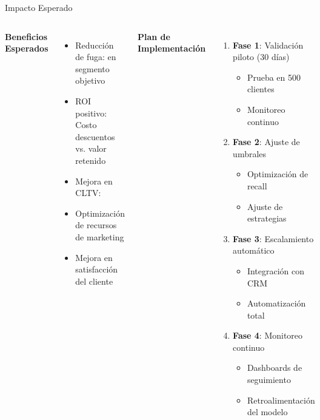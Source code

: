 
\begin{frame}{Impacto Esperado}
    \begin{columns}[t]
        \textbf{Beneficios Esperados}
        \begin{itemize}
            \item Reducción de fuga:  en segmento objetivo
            \item ROI positivo: Costo descuentos vs. valor retenido
            \item Mejora en CLTV: 
            \item Optimización de recursos de marketing
            \item Mejora en satisfacción del cliente
        \end{itemize}
        
        \textbf{Plan de Implementación}
        \begin{enumerate}
            \item \textbf{Fase 1}: Validación piloto (30 días)
            \begin{itemize}
                \item Prueba en 500 clientes
                \item Monitoreo continuo
            \end{itemize}
            \item \textbf{Fase 2}: Ajuste de umbrales
            \begin{itemize}
                \item Optimización de recall
                \item Ajuste de estrategias
            \end{itemize}
            \item \textbf{Fase 3}: Escalamiento automático
            \begin{itemize}
                \item Integración con CRM
                \item Automatización total
            \end{itemize}
            \item \textbf{Fase 4}: Monitoreo continuo
            \begin{itemize}
                \item Dashboards de seguimiento
                \item Retroalimentación del modelo
            \end{itemize}
        \end{enumerate}
    \end{columns}
\end{frame}

